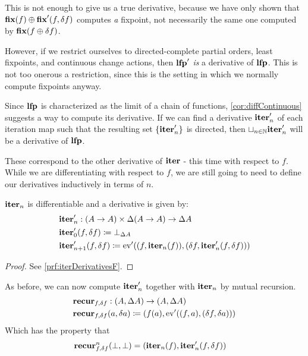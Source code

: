 This is not enough to give us a true derivative, because we have only shown
that $\textbf{fix}(f) \oplus \textbf{fix}'(f, \delta f)$ computes \emph{a} fixpoint, not necessarily
the same one computed by $\textbf{fix}{(f \oplus\delta f)}$.

However, if we restrict ourselves to directed-complete partial orders, least
fixpoints, and continuous change actions, then $\textbf{lfp}'$ \emph{is} a
derivative of $\textbf{lfp}$. This is not too onerous a restriction, since this is
the setting in which we normally compute fixpoints anyway.

Since $\textbf{lfp}$ is characterized as the limit of a chain of functions,
\cref{cor:diffContinuous} suggests a way to compute its derivative. If we can find a derivative
$\textbf{iter}_n'$ of each iteration map 
such that the resulting set $\{ \textbf{iter}_n' \}$ is directed, then $\sqcup_{n \in \mathbb{N}}\textbf{iter}_n'$ will be a derivative of $\textbf{lfp}$.

These correspond to the other derivative of $\textbf{iter}$ - this time with respect to
$f$. While we are differentiating with respect to $f$, we are still going to
need to define our derivatives inductively in terms of $n$.

\begin{prop}[name=Derivative of the iteration map with respect to $f$, restate=iterDerivativesF]
  \label{prop:iterDerivativesF}
  $\textbf{iter}_n$ is differentiable and a derivative is given by:
  \begin{align*}
    &\textbf{iter}_n' : (A \rightarrow A) \times \Delta (A \rightarrow A) \rightarrow \Delta A\\
    &\textbf{iter}_0' (f, \delta f) \coloneqq \bot_{\Delta A}\\
    &\textbf{iter}_{n+1}' (f, \delta f) \coloneqq \operatorname{ev}'((f, \textbf{iter}_n(f)), (\delta f, \textbf{iter}_n'(f, \delta f)))
  \end{align*}
\end{prop}
\ifproofs
\begin{proof}
  See \cref{prf:iterDerivativesF}.
\end{proof}
\fi

As before, we can now compute $\textbf{iter}_n'$ together with $\textbf{iter}_n$ by
mutual recursion. 
\begin{align*}
  &\textbf{recur}_{f, \delta f} : (A, \Delta A) \rightarrow (A, \Delta A)\\
  &\textbf{recur}_{f, \delta f} (a, \delta a) \coloneqq (f(a), \operatorname{ev}'((f, a), (\delta f, \delta a)))
\end{align*}
Which has the property that
\begin{align*}
  &\textbf{recur}_{f, \delta f}^n (\bot, \bot) = (\textbf{iter}_n(f), \textbf{iter}_n'(f, \delta f))
\end{align*}

